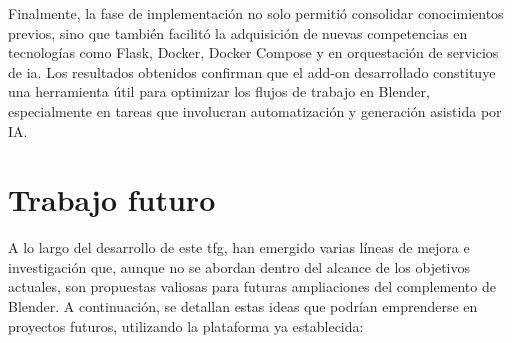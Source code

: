 Finalmente, la fase de implementación no solo permitió consolidar conocimientos previos, sino que también facilitó la adquisición de nuevas competencias en tecnologías como Flask, Docker, Docker Compose y en orquestación de servicios de \gls{ia}. Los resultados obtenidos confirman que el add-on desarrollado constituye una herramienta útil para optimizar los flujos de trabajo en Blender, especialmente en tareas que involucran automatización y generación asistida por IA.

\section{Trabajo futuro}

A lo largo del desarrollo de este \gls{tfg}, han emergido varias líneas de mejora e investigación que, aunque no se abordan dentro del alcance de los objetivos actuales, son propuestas valiosas para futuras ampliaciones del complemento de Blender. A continuación, se detallan estas ideas que podrían emprenderse en proyectos futuros, utilizando la plataforma ya establecida:

